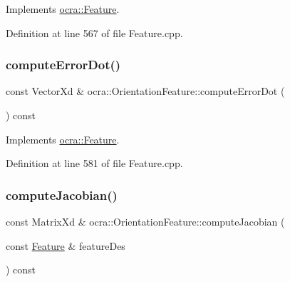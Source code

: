 Implements \hyperlink{classocra_1_1Feature_ac714181e1bb25f878349e299c4ba8c00}{ocra\+::\+Feature}.



Definition at line 567 of file Feature.\+cpp.

\hypertarget{classocra_1_1OrientationFeature_abf35648fec0b8744710cfd9da704cbbf}{}\label{classocra_1_1OrientationFeature_abf35648fec0b8744710cfd9da704cbbf} 
\subsubsection{\texorpdfstring{compute\+Error\+Dot()}{computeErrorDot()}\hspace{0.1cm}{\footnotesize\ttfamily [2/2]}}
{\footnotesize\ttfamily const Vector\+Xd \& ocra\+::\+Orientation\+Feature\+::compute\+Error\+Dot (\begin{DoxyParamCaption}{ }\end{DoxyParamCaption}) const\hspace{0.3cm}{\ttfamily [virtual]}}



Implements \hyperlink{classocra_1_1Feature_a01a4870418ba87d5b41d8f917c1255fc}{ocra\+::\+Feature}.



Definition at line 581 of file Feature.\+cpp.

\hypertarget{classocra_1_1OrientationFeature_a14327a30bae8c06ea241aeeb19a48631}{}\label{classocra_1_1OrientationFeature_a14327a30bae8c06ea241aeeb19a48631} 
\subsubsection{\texorpdfstring{compute\+Jacobian()}{computeJacobian()}\hspace{0.1cm}{\footnotesize\ttfamily [1/2]}}
{\footnotesize\ttfamily const Matrix\+Xd \& ocra\+::\+Orientation\+Feature\+::compute\+Jacobian (\begin{DoxyParamCaption}\item[{const \hyperlink{classocra_1_1Feature}{Feature} \&}]{feature\+Des }\end{DoxyParamCaption}) const\hspace{0.3cm}{\ttfamily [virtual]}}



